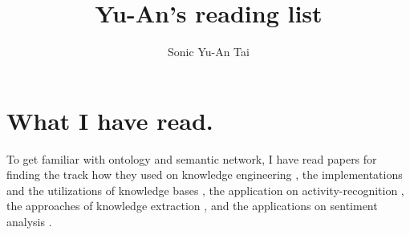 \documentclass[a4paper]{article}
\title{\textbf{Yu-An's reading list}}
\author{Sonic Yu-An Tai}
\begin{document}
\maketitle

\section{What I have read.}
To get familiar with ontology and semantic network, I have read papers for finding the track how they used on knowledge engineering \cite{gruber1993translation, niles2001towards, noy2001ontology}, the implementations and the utilizations of knowledge bases \cite{liu2004conceptnet, suchanet2007yago, hoffart2011yago, ylkuo2011amultiagent, speer2012representing}, the application on activity-recognition \cite{chen2009ontology}, the approaches of knowledge extraction \cite{suchanek2013knowledge}, and the applications on sentiment analysis \cite{kouloumpis2011twitter, medhat2014sentiment}.


 

\end{document}
